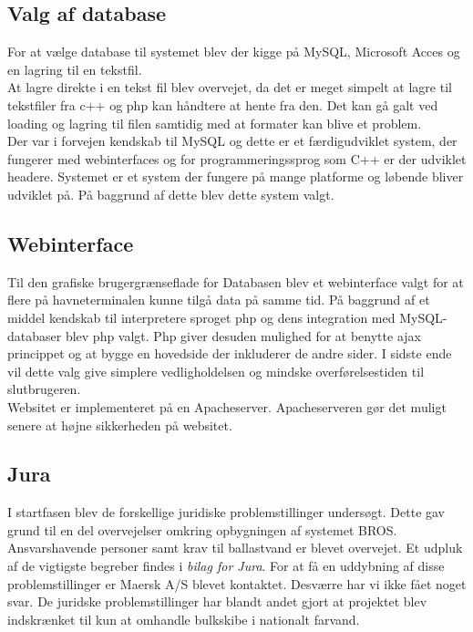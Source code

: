 \subsection{Valg af database}
For at vælge database til systemet blev der kigge på MySQL, Microsoft Acces og en lagring til en tekstfil.\\
At lagre direkte i en tekst fil blev overvejet, da det er meget simpelt at lagre til tekstfiler fra c++ og php kan håndtere at hente fra den. Det kan gå galt ved loading og lagring til filen samtidig med at formater kan blive et problem. \\
Der var i forvejen kendskab til MySQL og dette er et færdigudviklet system, der fungerer med webinterfaces og for programmeringssprog som C++ er der udviklet headere. Systemet er et system der fungere på mange platforme og løbende bliver udviklet på. På baggrund af dette blev dette system valgt.

\subsection{Webinterface}
Til den grafiske brugergrænseflade for Databasen blev et webinterface valgt for at flere på havneterminalen kunne tilgå data på samme tid. På baggrund af et middel kendskab til interpretere sproget php og dens integration med MySQL-databaser blev php valgt. Php giver desuden mulighed for at benytte ajax princippet og at bygge en hovedside der inkluderer de andre sider. I sidste ende vil dette valg give simplere vedligholdelsen og mindske overførelsestiden til slutbrugeren.\\
Websitet er implementeret på en Apacheserver. Apacheserveren gør det muligt senere at højne sikkerheden på websitet.

\subsection{Jura}
I startfasen blev de forskellige juridiske problemstillinger undersøgt. Dette gav grund til en del overvejelser omkring opbygningen af systemet BROS. Ansvarshavende personer samt krav til ballastvand er blevet overvejet. Et udpluk af de vigtigste begreber findes i \textit{bilag for Jura}.
For at få en uddybning af disse problemstillinger er Maersk A/S blevet kontaktet. Desværre har vi ikke fået noget svar. De juridske problemstillinger har blandt andet gjort at projektet blev indskrænket til kun at omhandle bulkskibe i nationalt farvand.

